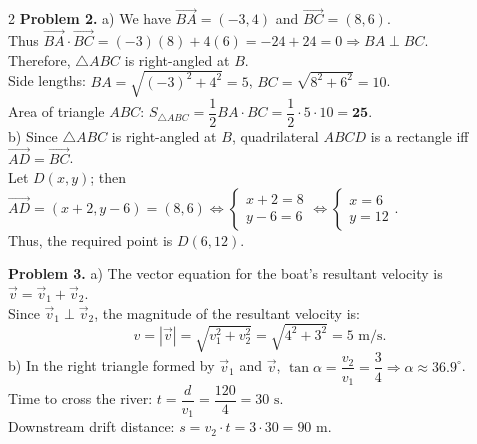 \documentclass[10pt,a4paper]{article}
\begin{document}
\begin{multicols}{2}
\textbf{Problem 2.}
a) We have $\vec{BA} = (-3, 4)$ and $\vec{BC} = (8, 6)$.\\
Thus $\vec{BA} \cdot \vec{BC} = (-3)(8) + 4(6) = -24 + 24 = 0 \Rightarrow BA \perp BC$.\\
Therefore, $\triangle ABC$ is right-angled at $B$.\\
Side lengths: $BA = \sqrt{(-3)^2 + 4^2} = 5$, $BC = \sqrt{8^2 + 6^2} = 10$.\\
Area of triangle $ABC$: $S_{\triangle ABC} = \dfrac{1}{2} BA \cdot BC = \dfrac{1}{2} \cdot 5 \cdot 10 = \mathbf{25}$.\\
b) Since $\triangle ABC$ is right-angled at $B$, quadrilateral $ABCD$ is a rectangle iff $\vec{AD} = \vec{BC}$.\\
Let $D(x, y)$; then $\vec{AD} = (x + 2, y - 6) = (8, 6) \Leftrightarrow \begin{cases} x + 2 = 8 \\ y - 6 = 6 \end{cases} \Leftrightarrow \begin{cases} x = 6 \\ y = 12 \end{cases}$.\\
Thus, the required point is $D(6, 12)$.

\textbf{Problem 3.}
a) The vector equation for the boat's resultant velocity is $\vec{v} = \vec{v}_1 + \vec{v}_2$.\\
Since $\vec{v}_1 \perp \vec{v}_2$, the magnitude of the resultant velocity is:
$$v = |\vec{v}| = \sqrt{v_1^2 + v_2^2} = \sqrt{4^2 + 3^2} = 5\text{ m/s}.$$
b) In the right triangle formed by $\vec{v}_1$ and $\vec{v}$, $\tan\alpha = \dfrac{v_2}{v_1} = \dfrac{3}{4} \Rightarrow \alpha \approx 36.9^\circ$.\\
Time to cross the river: $t = \dfrac{d}{v_1} = \dfrac{120}{4} = 30\text{ s}$.\\
Downstream drift distance: $s = v_2 \cdot t = 3 \cdot 30 = 90\text{ m}$.

\end{multicols}
\end{document}
